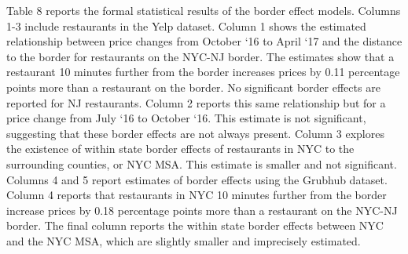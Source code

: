 \documentclass[11pt]{article}
\begin{document}
Table 8 reports the formal statistical results of the border effect models. Columns 1-3 include restaurants in the Yelp dataset. Column 1 shows the estimated relationship between price changes from October `16 to April `17 and the distance to the border for restaurants on the NYC-NJ border. The estimates show that a restaurant 10 minutes further from the border increases prices by 0.11 percentage points more than a restaurant on the border. No significant border effects are reported for NJ restaurants. Column 2 reports this same relationship but for a price change from July `16 to October `16. This estimate is not significant, suggesting that these border effects are not always present. Column 3 explores the existence of within state border effects of restaurants in NYC to the surrounding counties, or NYC MSA. This estimate is smaller and not significant. Columns 4 and 5 report estimates of border effects using the Grubhub dataset. Column 4 reports that restaurants in NYC 10 minutes further from the border increase prices by 0.18 percentage points more than a restaurant on the NYC-NJ border. The final column reports the within state border effects between NYC and the NYC MSA, which are slightly smaller and imprecisely estimated. 


\end{document}
